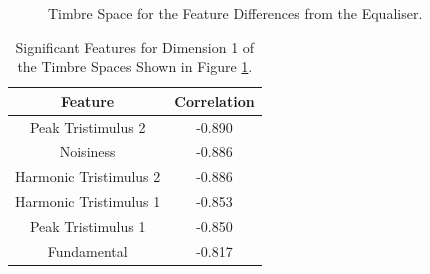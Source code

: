 		\begin{figure}[h!]
			\centering
			\qquad
			\caption{Timbre Space for the Feature Differences from the Equaliser.}
			\label{fig:EqualiserDifferenceMDSs}
		\end{figure}

		\begin{table}[h!]
			\centering
			\begin{tabular}{|c|c|}
				\hline
				\bf{Feature} & \bf{Correlation} \\
				\hline
				\hline
				Peak Tristimulus 2 & -0.890 \\
				\hline
				Noisiness & -0.886 \\
				\hline
				Harmonic Tristimulus 2 & -0.886 \\
				\hline
				Harmonic Tristimulus 1 & -0.853 \\
				\hline
				Peak Tristimulus 1 & -0.850 \\
				\hline
				Fundamental & -0.817 \\
				\hline
			\end{tabular}
			\caption{Significant Features for Dimension 1 of the Timbre Spaces Shown in Figure 
				 \ref{fig:EqualiserDifferenceMDSs}.}
			\label{tab:EqualiserDifferenceFeatures}
		\end{table}

